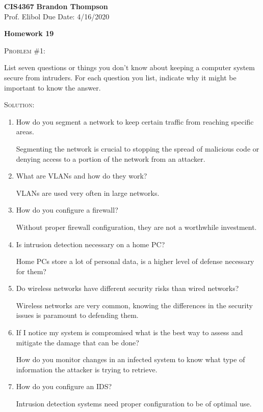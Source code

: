 \documentclass[12pt]{article}
\newenvironment{problem}[1]
{\begin{mdframed}[linewidth=0.8pt]
        \textsc{Problem #1:}

}
    {\end{mdframed}}
\newenvironment{solution}
    {\textsc{Solution:}\\}
    {\newpage}%
\begin{document}
\noindent
\textbf{CIS4367} \hfill \textbf{Brandon Thompson} \\
\normalsize Prof. Elibol \hfill Due Date: 4/16/2020 \\

\begin{center}
\textbf{Homework 19}
\end{center}
	\begin{problem}{\#1}
		List seven questions or things you don't know about keeping a computer system secure from intruders. For each question you list, indicate why it might be important to know the answer.
	\end{problem}
	\begin{solution}
		\begin{enumerate}
			\item How do you segment a network to keep certain traffic from reaching specific areas.
				
				Segmenting the network is crucial to stopping the spread of malicious code or denying access to a portion of the network from an attacker.
			\item What are VLANs and how do they work?

				VLANs are used very often in large networks.
			\item How do you configure a firewall?

				Without proper firewall configuration, they are not a worthwhile investment.
			\item Is intrusion detection necessary on a home PC?

				Home PCs store a lot of personal data, is a higher level of defense necessary for them?
			\item Do wireless networks have different security risks than wired networks?
				
				Wireless networks are very common, knowing the differences in the security issues is paramount to defending them.
			\item If I notice my system is compromised what is the best way to assess and mitigate the damage that can be done?

				How do you monitor changes in an infected system to know what type of information the attacker is trying to retrieve.
			\item How do you configure an IDS?

				Intrusion detection systems need proper configuration to be of optimal use.
		\end{enumerate}
	\end{solution}
\end{document}
